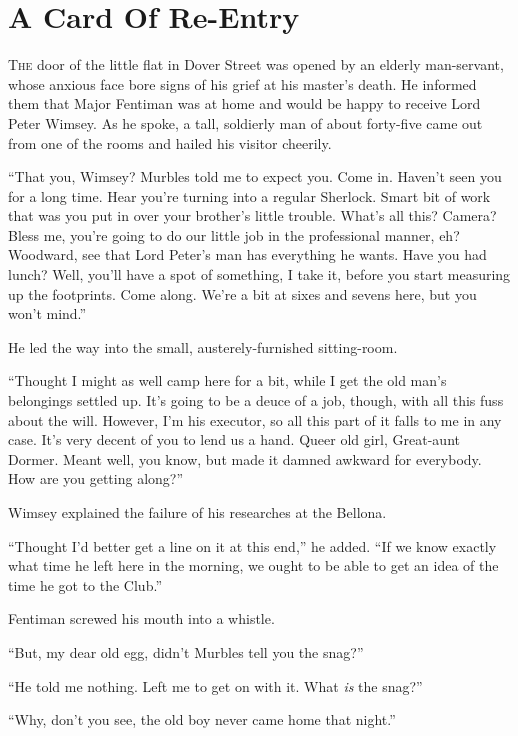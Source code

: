 \chapter{A Card Of Re-Entry}
\lettrine[lines=4]{T}{he} door of the little flat in Dover Street was opened by an elderly man-servant, whose anxious face bore signs of his grief at his master's death. He informed them that Major Fentiman was at home and would be happy to receive Lord Peter Wimsey. As he spoke, a tall, soldierly man of about forty-five came out from one of the rooms and hailed his visitor cheerily.

\enquote{That you, Wimsey? Murbles told me to expect you. Come in. Haven't seen you for a long time. Hear you're turning into a regular Sherlock. Smart bit of work that was you put in over your brother's little trouble. What's all this? Camera? Bless me, you're going to do our little job in the professional manner, eh? Woodward, see that Lord Peter's man has everything he wants. Have you had lunch? Well, you'll have a spot of something, I take it, before you start measuring up the footprints. Come along. We're a bit at sixes and sevens here, but you won't mind.}

He led the way into the small, austerely-furnished sitting-room.

\enquote{Thought I might as well camp here for a bit, while I get the old man's belongings settled up. It's going to be a deuce of a job, though, with all this fuss about the will. However, I'm his executor, so all this part of it falls to me in any case. It's very decent of you to lend us a hand. Queer old girl, Great-aunt Dormer. Meant well, you know, but made it damned awkward for everybody. How are you getting along?}

Wimsey explained the failure of his researches at the Bellona.

\enquote{Thought I'd better get a line on it at this end,} he added. \enquote{If we know exactly what time he left here in the morning, we ought to be able to get an idea of the time he got to the Club.}

Fentiman screwed his mouth into a whistle.

\enquote{But, my dear old egg, didn't Murbles tell you the snag?}

\enquote{He told me nothing. Left me to get on with it. What \textit{is} the snag?}

\enquote{Why, don't you see, the old boy never came home that night.}

